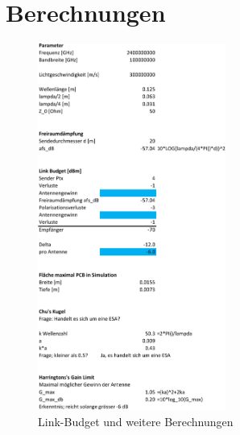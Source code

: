 \section{Berechnungen}

\begin{figure}[h!]
	\centering
	\includegraphics[width=0.55\textwidth]{../design/Berechnungen_Excel-crop.pdf}
	\caption{Link-Budget und weitere Berechnungen}
\end{figure}

